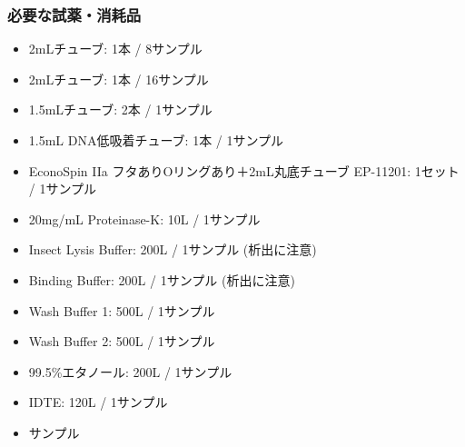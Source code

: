 \documentclass[titlepage,10pt,a4paper,uplatex]{jsbook}
\begin{document}
\subsubsection{必要な試薬・消耗品}
\begin{itemize}
\item 2mLチューブ: 1本 / 8サンプル
\item 2mLチューブ: 1本 / 16サンプル
\item 1.5mLチューブ: 2本 / 1サンプル
\item 1.5mL DNA低吸着チューブ: 1本 / 1サンプル
\item EconoSpin IIa フタありOリングあり＋2mL丸底チューブ EP-11201: 1セット / 1サンプル
\item 20mg/mL Proteinase-K: 10{\textmu}L / 1サンプル
\item Insect Lysis Buffer: 200{\textmu}L / 1サンプル (析出に注意)
\item Binding Buffer: 200{\textmu}L / 1サンプル (析出に注意)
\item Wash Buffer 1: 500{\textmu}L / 1サンプル
\item Wash Buffer 2: 500{\textmu}L / 1サンプル
\item 99.5\%エタノール: 200{\textmu}L / 1サンプル
\item IDTE: 120{\textmu}L / 1サンプル
\item サンプル
\end{itemize}
\end{document}
